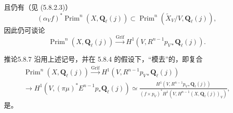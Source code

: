 且仍有（见 (5.8.2.3)）
\begin{equation}\tag{5.8.6.3}(\alpha_Vf)^*\operatorname{Prim}^n(X,\mathbf Q_\ell(j))\subset\operatorname{Prim}^n(\widetilde X_V/V,\mathbf Q_\ell(j)),\end{equation}
因此仍可谈论
\begin{equation}\tag{5.8.6.4}\operatorname{Prim}^n(X,\mathbf Q_\ell(j))\xrightarrow{\operatorname{Grif}}H^1(V,R^{n-1}p_{V*}\mathbf Q_\ell(j)).\end{equation}
\begin{SGAresult}{推论}{5.8.7}
沿用上述记号，并在 5.8.4 的假设下，“模去”的，即复合
\begin{equation}\tag{5.8.7.1}\begin{gathered}
\operatorname{Prim}^n(X,\mathbf Q_\ell(j))\xrightarrow{\operatorname{Grif}}H^1(V,R^{n-1}p_{V*}\mathbf Q_\ell(j))\\
\longrightarrow H^1(V,(\pi\mu)^*E^{n-1}p_*\mathbf Q_\ell(j))\simeq\frac{H^1(V,R^{n-1}p_{V*}\mathbf Q_\ell(j))}{(f\times p_V)^*H^1(V,H^{n-1}(X,\mathbf Q_\ell(j))_V)},
\end{gathered}\end{equation}
是。
\end{SGAresult}
